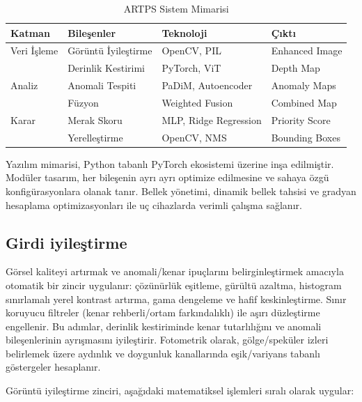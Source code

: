 \documentclass[12pt]{article}
\begin{document}
\begin{table}[h]
\centering
\begin{tabular}{|l|l|l|l|}
\hline
\textbf{Katman} & \textbf{Bileşenler} & \textbf{Teknoloji} & \textbf{Çıktı} \\
\hline
Veri İşleme & Görüntü İyileştirme & OpenCV, PIL & Enhanced Image \\
& Derinlik Kestirimi & PyTorch, ViT & Depth Map \\
\hline
Analiz & Anomali Tespiti & PaDiM, Autoencoder & Anomaly Maps \\
& Füzyon & Weighted Fusion & Combined Map \\
\hline
Karar & Merak Skoru & MLP, Ridge Regression & Priority Score \\
& Yerelleştirme & OpenCV, NMS & Bounding Boxes \\
\hline
\end{tabular}
\caption{ARTPS Sistem Mimarisi}
\end{table}

Yazılım mimarisi, Python tabanlı PyTorch ekosistemi üzerine inşa edilmiştir. Modüler tasarım, her bileşenin ayrı ayrı optimize edilmesine ve sahaya özgü konfigürasyonlara olanak tanır. Bellek yönetimi, dinamik bellek tahsisi ve gradyan hesaplama optimizasyonları ile uç cihazlarda verimli çalışma sağlanır.



\subsection{Girdi iyileştirme}
Görsel kaliteyi artırmak ve anomali/kenar ipuçlarını belirginleştirmek amacıyla otomatik bir zincir uygulanır: çözünürlük eşitleme, gürültü azaltma, histogram sınırlamalı yerel kontrast artırma, gama dengeleme ve hafif keskinleştirme. Sınır koruyucu filtreler (kenar rehberli/ortam farkındalıklı) ile aşırı düzleştirme engellenir. Bu adımlar, derinlik kestiriminde kenar tutarlılığını ve anomali bileşenlerinin ayrışmasını iyileştirir. Fotometrik olarak, gölge/speküler izleri belirlemek üzere aydınlık ve doygunluk kanallarında eşik/variyans tabanlı göstergeler hesaplanır.

Görüntü iyileştirme zinciri, aşağıdaki matematiksel işlemleri sıralı olarak uygular:
\end{document}
